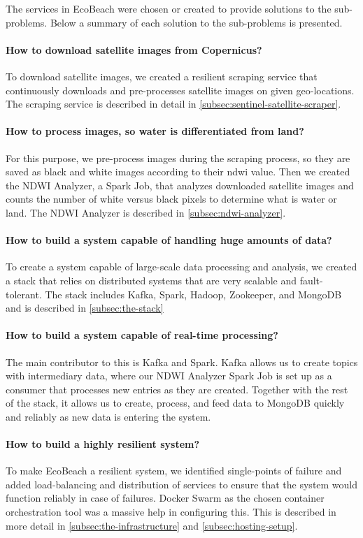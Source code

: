 \noindent
The services in EcoBeach were chosen or created to provide solutions to the sub-problems. Below a summary of each solution to the sub-problems is presented.

\paragraph{How to download satellite images from Copernicus?} To download satellite images, we created a resilient scraping service that continuously downloads and pre-processes satellite images on given geo-locations. The scraping service is described in detail in \autoref{subsec:sentinel-satellite-scraper}.

\paragraph{How to process images, so water is differentiated from land?} For this purpose, we pre-process images during the scraping process, so they are saved as black and white images according to their \acrfull{ndwi} value. Then we created the NDWI Analyzer, a Spark Job, that analyzes downloaded satellite images and counts the number of white versus black pixels to determine what is water or land. The NDWI Analyzer is described in \autoref{subsec:ndwi-analyzer}.

\paragraph{How to build a system capable of handling huge amounts of data?} To create a system capable of large-scale data processing and analysis, we created a stack that relies on distributed systems that are very scalable and fault-tolerant. The stack includes Kafka, Spark, Hadoop, Zookeeper, and MongoDB and is described in \autoref{subsec:the-stack}

\paragraph{How to build a system capable of real-time processing?} The main contributor to this is Kafka and Spark. Kafka allows us to create topics with intermediary data, where our NDWI Analyzer Spark Job is set up as a consumer that processes new entries as they are created. Together with the rest of the stack, it allows us to create, process, and feed data to MongoDB quickly and reliably as new data is entering the system.

\paragraph{How to build a highly resilient system?} To make EcoBeach a resilient system, we identified single-points of failure and added load-balancing and distribution of services to ensure that the system would function reliably in case of failures. Docker Swarm as the chosen container orchestration tool was a massive help in configuring this. This is described in more detail in \autoref{subsec:the-infrastructure} and \autoref{subsec:hosting-setup}.

